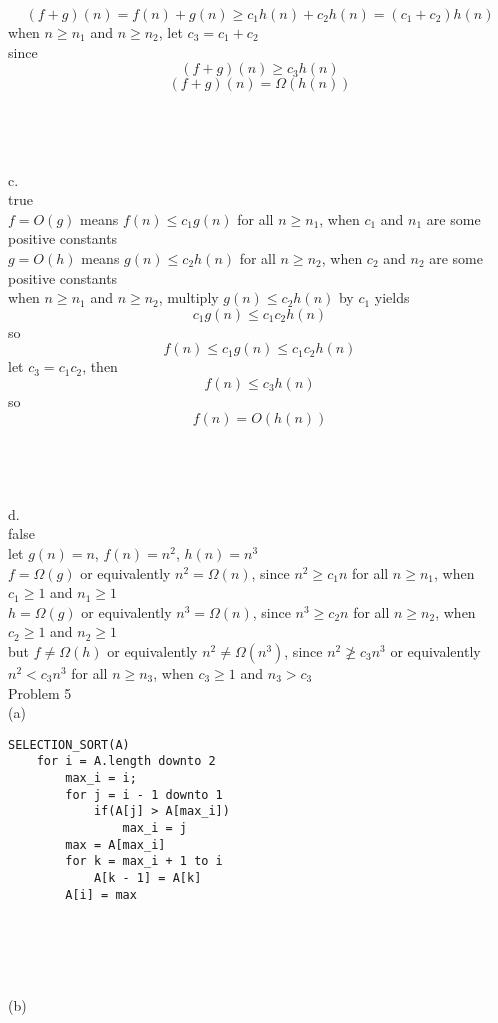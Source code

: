 \documentclass[12pt,border=4pt,multi]{article}%
\begin{document}
\[(f + g)(n) = f(n) + g(n) \geq c_1 h(n) + c_2 h(n) = (c_1 + c_2)h(n)\]
when $n \geq n_1$ and $n \geq n_2$, let $c_3 = c_1 + c_2$\\
since 
\[(f + g)(n) \geq c_3 h(n)\]
\[(f + g)(n) =  \Omega(h(n))\]
\\
\\
\\
\\
c.\\
true\\
$f = O(g)$ means $f(n) \leq c_1 g(n)$ for all $n \geq n_1$, when $c_1$ and $n_1$ are some positive constants\\
$g = O(h)$ means $g(n) \leq c_2 h(n)$ for all $n \geq n_2$, when $c_2$ and $n_2$ are some positive constants\\
when $n \geq n_1$ and $n \geq n_2$, multiply $g(n) \leq c_2 h(n)$ by $c_1$ yields
\[c_1 g(n) \leq c_1 c_2 h(n)\]
so 
\[f(n) \leq c_1 g(n) \leq c_1 c_2 h(n)\]
let $c_3 = c_1 c_2$, 
then 
\[f(n) \leq c_3 h(n)\]
so
\[f(n) = O(h(n))\]
\\
\\
\\
\\
d.\\
false\\
let $g(n) = n$, $f(n) = n^2$, $h(n) = n^3$\\
$f = \Omega(g)$ or equivalently $n^2 = \Omega(n)$, since $n^2 \geq c_1 n$ for all $n \geq n_1$, when $c_1 \geq 1$ and $n_1 \geq 1$\\
$h = \Omega(g)$ or equivalently $n^3 = \Omega(n)$, since $n^3 \geq c_2 n$ for all $n \geq n_2$, when $c_2 \geq 1$ and $n_2 \geq 1$\\
but $f \not= \Omega(h)$ or equivalently $n^2 \not= \Omega(n^3)$, since $n^2 \not\geq c_3 n^3$ or equivalently $n^2 < c_3 n^3$ for all $n \geq n_3$, when $c_3 \geq 1$ and $n_3 > c_3$\\
\newpage
\noindent
Problem 5\\
(a)
\begin{lstlisting}
SELECTION_SORT(A)
    for i = A.length downto 2
        max_i = i;
        for j = i - 1 downto 1
            if(A[j] > A[max_i])
                max_i = j
        max = A[max_i]
        for k = max_i + 1 to i
            A[k - 1] = A[k]
        A[i] = max
\end{lstlisting}
\\
\\
\\
\\
(b)\\
\end{document}
